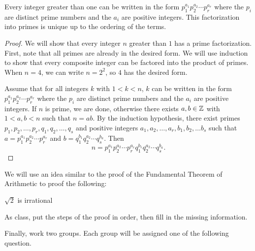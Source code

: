 \documentclass{ximera}
\begin{document}


\begin{thm*}\label{FTA}
	Every integer greater than one can be written in the form $p_1^{a_1}p_2^{a_2}\cdots p_r^{a_r}$ where the $p_i$ are distinct prime numbers and the $a_i$ are positive integers. This factorization into primes is unique up to the ordering of the terms.

	\begin{proof}
 		We will show that every integer $n$ greater than $1$ has a prime factorization. First, note that all primes are already in the desired form. We will use induction to show that every composite integer can be factored into the product of primes. When $n=4$, we can write $n=2^2$, so $4$ has the desired form.
 
		Assume that for all integers $k$ with $1<k<n$, $k$ can be written in the form  $p_1^{a_1}p_2^{a_2}\cdots p_r^{a_r}$ where the $p_i$ are distinct prime numbers and the $a_i$ are positive integers. If $n$ is prime, we are done, otherwise there exists $a,b\in\mathbb Z$ with $1<a,b<n$ such that $n=ab$. By the induction hypothesis, there exist primes $p_1,p_2,\dots,p_r,q_1,q_2,\dots,q_s$ and positive integers $a_1,a_2,\dots,a_r,b_1,b_2,\dots b_s$ such that $a=p_1^{a_1}p_2^{a_2}\cdots p_r^{a_r}$ and $b=q_1^{b_1}q_2^{a_2}\cdots q_s^{b_a}$. Then \[n=p_1^{a_1}p_2^{a_2}\cdots p_r^{a_r}q_1^{b_1}q_2^{a_2}\cdots q_s^{b_a}.\]
	\end{proof}
\end{thm*}

We will use an idea similar to the proof of the Fundamental Theorem of Arithmetic to proof the following:

\begin{br}
	\begin{prop*}
		$\sqrt{2}$ is irrational
	\end{prop*}

	As class, put the steps of the proof in order, then fill in the missing information.
\end{br}

Finally, work two groups. Each group will be assigned one of the following question.
\end{document}
